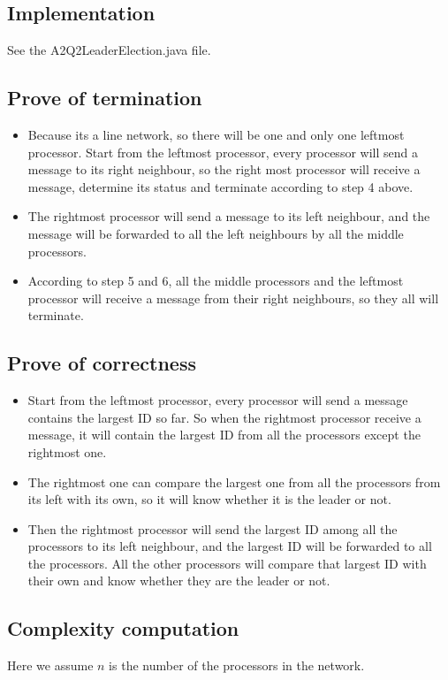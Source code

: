 \documentclass[paper=a4, fontsize=11pt]{scrartcl} %
\numberwithin{equation}{section} %
\numberwithin{figure}{section} %
\numberwithin{table}{section} %
\begin{document}
\subsection*{Implementation}
See the A2Q2LeaderElection.java file.
\subsection*{Prove of termination}
\begin{itemize}
	\item Because its a line network, so there will be one and only one leftmost processor. Start from the leftmost processor, every processor will send a message to its right neighbour, so the right most processor will receive a message, determine its status and terminate according to step 4 above. 
	\item The rightmost processor will send a message to its left neighbour, and the message will be forwarded to all the left neighbours by all the middle processors. 
	\item According to step 5 and 6, all the middle processors and the leftmost processor will receive a message from their right neighbours, so they all will terminate.
\end{itemize}
\subsection*{Prove of correctness}
\begin{itemize}
	\item Start from the leftmost processor, every processor will send a message contains the largest ID so far. So when the rightmost processor receive a message, it will contain the largest ID from all the processors except the rightmost one. 
	\item The rightmost one can compare the largest one from all the processors from its left with its own, so it will know whether it is the leader or not. 
	\item Then the rightmost processor will send the largest ID among all the processors to its left neighbour, and the largest ID will be forwarded to all the processors. All the other processors will compare that largest ID with their own and know whether they are the leader or not. 
\end{itemize}
\subsection*{Complexity computation}
Here we assume $n$ is the number of the processors in the network.
\end{document}

